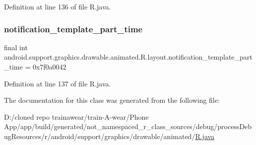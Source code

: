 Definition at line 136 of file R.\+java.

\mbox{\label{classandroid_1_1support_1_1graphics_1_1drawable_1_1animated_1_1_r_1_1layout_a58ea2615a1760f93ef687e8c1db58feb}} 
\subsubsection{\texorpdfstring{notification\_template\_part\_time}{notification\_template\_part\_time}}
{\footnotesize\ttfamily final int android.\+support.\+graphics.\+drawable.\+animated.\+R.\+layout.\+notification\+\_\+template\+\_\+part\+\_\+time = 0x7f0a0042\hspace{0.3cm}{\ttfamily [static]}}



Definition at line 137 of file R.\+java.



The documentation for this class was generated from the following file\+:\begin{DoxyCompactItemize}
\item 
D\+:/cloned repo trainawear/train-\/\+A-\/wear/\+Phone App/app/build/generated/not\+\_\+namespaced\+\_\+r\+\_\+class\+\_\+sources/debug/process\+Debug\+Resources/r/android/support/graphics/drawable/animated/\mbox{\hyperlink{process_debug_resources_2r_2android_2support_2graphics_2drawable_2animated_2_r_8java}{R.\+java}}\end{DoxyCompactItemize}
